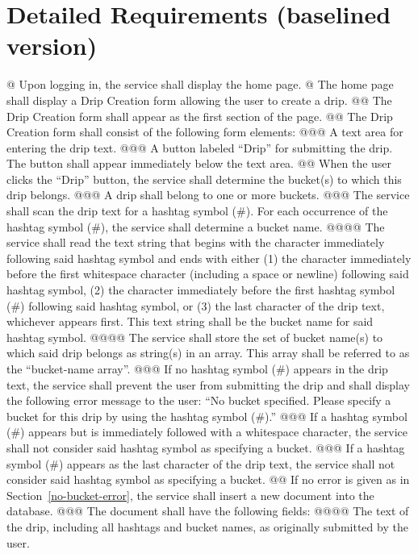 \documentclass{article}
\begin{document}
\section*{Detailed Requirements (baselined version)}

\begin{easylist}[articletoc]
@ Upon logging in, the service shall display the home page.
@ The home page shall display a Drip Creation form allowing the user to create a drip.
@@ The Drip Creation form shall appear as the first section of the page.
@@ The Drip Creation form shall consist of the following form elements:
@@@ A text area for entering the drip text.
@@@ A button labeled ``Drip'' for submitting the drip. The button shall appear immediately below the text area.
@@ \label{submit-drip}When the user clicks the ``Drip'' button, the service shall determine the bucket(s) to which this drip belongs.
@@@ A drip shall belong to one or more buckets.
@@@ The service shall scan the drip text for a hashtag symbol (\#). For each occurrence of the hashtag symbol (\#), the service shall determine a bucket name.
@@@@ The service shall read the text string that begins with the character immediately following said hashtag symbol and ends with either (1) the character immediately before the first whitespace character (including a space or newline) following said hashtag symbol, (2) the character immediately before the first hashtag symbol (\#) following said hashtag symbol, or (3) the last character of the drip text, whichever appears first. This text string shall be the bucket name for said hashtag symbol.
@@@@ \label{bucket-name-array}The service shall store the set of bucket name(s) to which said drip belongs as string(s) in an array. This array shall be referred to as the ``bucket-name array''.
@@@ \label{no-bucket-error}If no hashtag symbol (\#) appears in the drip text, the service shall prevent the user from submitting the drip and shall display the following error message to the user: ``No bucket specified. Please specify a bucket for this drip by using the hashtag symbol (\#).''
@@@ If a hashtag symbol (\#) appears but is immediately followed with a whitespace character, the service shall not consider said hashtag symbol as specifying a bucket.
@@@ If a hashtag symbol (\#) appears as the last character of the drip text, the service shall not consider said hashtag symbol as specifying a bucket.
@@ If no error is given as in Section~\ref{no-bucket-error}, the service shall insert a new document into the database.
@@@ The document shall have the following fields:
@@@@ The text of the drip, including all hashtags and bucket names, as originally submitted by the user.

\end{easylist}
\end{document}
